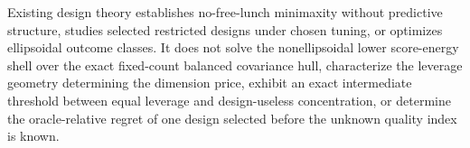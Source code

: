 Existing design theory establishes no-free-lunch minimaxity without predictive structure, studies selected restricted designs under chosen tuning, or optimizes ellipsoidal outcome classes. It does not solve the nonellipsoidal lower score-energy shell over the exact fixed-count balanced covariance hull, characterize the leverage geometry determining the dimension price, exhibit an exact intermediate threshold between equal leverage and design-useless concentration, or determine the oracle-relative regret of one design selected before the unknown quality index is known.